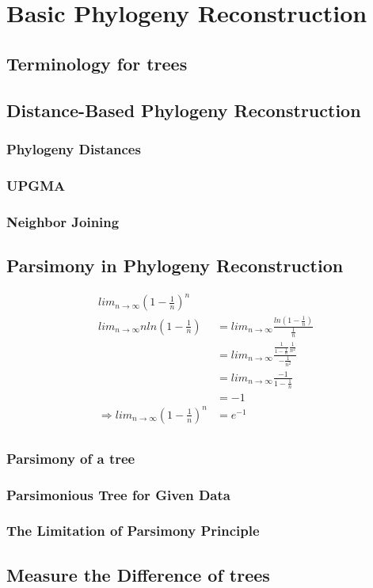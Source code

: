 \documentclass[12pt]{book}
\begin{document}
%  
\else
\fi

\chapter{Basic Phylogeny Reconstruction}

\section{Terminology for trees}

\section{Distance-Based Phylogeny Reconstruction}

    \subsection{Phylogeny Distances}
    \subsection{UPGMA}
    \subsection{Neighbor Joining}

\section{Parsimony in Phylogeny Reconstruction}

\begin{align*}
    {lim}_{n\rightarrow \infty}(1-\frac{1}{n})^n&\\
    {lim}_{n\rightarrow \infty} n ln(1-\frac{1}{n}) 
    &= {lim}_{n\rightarrow \infty} \frac{ln(1-\frac{1}{n})}{\frac{1}{n}} \\
    &= {lim}_{n\rightarrow \infty} \frac{\frac{1}{1-\frac{1}{n}}\frac{1}{n^2}}{-\frac{1}{n^2}}\\
    &= {lim}_{n\rightarrow \infty} \frac{-1}{1-\frac{1}{n}}\\
    &= -1\\
    \Rightarrow {lim}_{n\rightarrow \infty}(1-\frac{1}{n})^n &= e ^{-1}\\
\end{align*}

    \subsection{Parsimony of a tree}
    \subsection{Parsimonious Tree for Given Data}
    \subsection{The Limitation of Parsimony Principle}

\section{Measure the Difference of trees}



\ifx\allfiles\undefined
\end{document}
